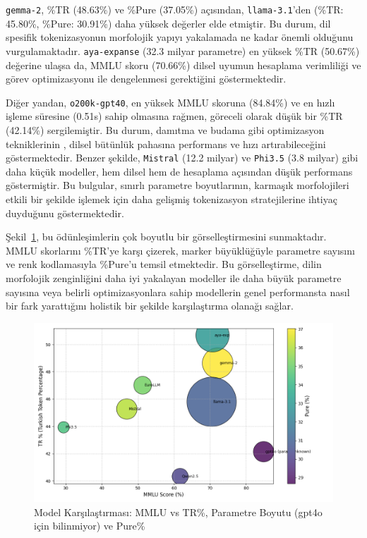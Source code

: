 \documentclass{article}
\begin{document}
\texttt{gemma-2}, \%TR (48.63\%) ve \%Pure (37.05\%) açısından, \texttt{llama-3.1}’den (\%TR: 45.80\%, \%Pure: 30.91\%) daha yüksek değerler elde etmiştir. Bu durum, dil spesifik tokenizasyonun morfolojik yapıyı yakalamada ne kadar önemli olduğunu vurgulamaktadır. \texttt{aya-expanse} (32.3 milyar parametre) en yüksek \%TR (50.67\%) değerine ulaşsa da, MMLU skoru (70.66\%) dilsel uyumun hesaplama verimliliği ve görev optimizasyonu ile dengelenmesi gerektiğini göstermektedir.

Diğer yandan, \texttt{o200k-gpt40}, en yüksek MMLU skoruna (84.84\%) ve en hızlı işleme süresine (0.51s) sahip olmasına rağmen, göreceli olarak düşük bir \%TR (42.14\%) sergilemiştir. Bu durum, damıtma ve budama gibi optimizasyon tekniklerinin \cite{lacy_gpt-4o_2024,shakrapani_gpt_nodate}, dilsel bütünlük pahasına performans ve hızı artırabileceğini göstermektedir. Benzer şekilde, \texttt{Mistral} (12.2 milyar) ve \texttt{Phi3.5} (3.8 milyar) gibi daha küçük modeller, hem dilsel hem de hesaplama açısından düşük performans göstermiştir. Bu bulgular, sınırlı parametre boyutlarının, karmaşık morfolojileri etkili bir şekilde işlemek için daha gelişmiş tokenizasyon stratejilerine ihtiyaç duyduğunu göstermektedir.

Şekil~\ref{fig:model_comparison}, bu ödünleşimlerin çok boyutlu bir görselleştirmesini sunmaktadır. MMLU skorlarını \%TR'ye karşı çizerek, marker büyüklüğüyle parametre sayısını ve renk kodlamasıyla \%Pure'u temsil etmektedir. Bu görselleştirme, dilin morfolojik zenginliğini daha iyi yakalayan modeller ile daha büyük parametre sayısına veya belirli optimizasyonlara sahip modellerin genel performansta nasıl bir fark yarattığını holistik bir şekilde karşılaştırma olanağı sağlar.

\begin{figure}[H]
    \centering
    \includegraphics[width=1\textwidth]{model_comparison.png}
    \caption{
    Model Karşılaştırması: MMLU vs TR\%, Parametre Boyutu (gpt4o için bilinmiyor) ve Pure\%
    }
    \label{fig:model_comparison}
\end{figure}
\end{document}
